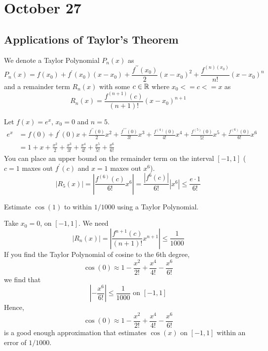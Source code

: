 \section{October 27}

\subsection{Applications of Taylor's Theorem}
\begin{definition}
    We denote a Taylor Polynomial $P_n(x)$ as
    $$P_n(x)=f\left(x_0\right)+f^{\prime}\left(x_0\right)\left(x-x_0\right)+\frac{f^{\prime \prime}\left(x_0\right)}{2}\left(x-x_0\right)^2+\frac{f^{(n)\left(x_0\right)}}{n !}\left(x-x_0\right)^n$$ 
    and a remainder term $R_n(x)$ with some $c \in \mathbb{R}$ where $x_0 <= c <= x$ as 
    $$R_n(x)=\frac{f^{(n+1)}(c)}{(n+1) !}\left(x-x_0\right)^{n+1}$$
\end{definition}

\noindent Let $f(x)=e^x$, $x_0=0$ and $n=5$.
\begin{align*}
    e^x &=f(0)+f^{\prime}(0) x+\frac{f^{\prime \prime}(0)}{2} x^2+\frac{f^{\prime \prime \prime}(0)}{3 !} x^3+\frac{f^{(4)}(0)}{4 !} x^4+\frac{f^{(5)}(0)}{5 !} x^5+\frac{f^{(6)}(0)}{6 !} x^6 \\
    &=1+x+\frac{x^2}{2}+\frac{x^3}{3 !}+\frac{x^4}{4 !}+\frac{x^5}{5 !}+\frac{x^6}{6 !}
\end{align*}
You can place an upper bound on the remainder term on the interval $[-1,1]$ ($c=1$ maxes out $f^{\prime}(c)$ and $x=1$ maxes out $x^6$).
$$\left|R_5(x)\right|=\left|\frac{f^{(6)}(c)}{6 !} x^6\right|=\frac{\left|f^6(c)\right|}{6 !}\left|x^6\right| \leq \frac{e \cdot 1}{6 !}$$

\begin{example}
    Estimate $\cos (1)$ to within $1 / 1000$ using a Taylor Polynomial.

    \noindent Take $x_0=0$, on $[-1,1]$. We need $$\left|R_n(x)\right|=\left|\frac{f^{n+1}(c)}{(n+1) !} x^{n+1}\right| \leq \frac{1}{1000}$$
    If you find the Taylor Polynomial of cosine to the 6th degree,
    $$\cos (0) \approx 1-\frac{x^2}{2 !}+\frac{x^4}{4 !}-\frac{x^6}{6 !}$$
    we find that
    $$\left|-\frac{x^6}{6 !}\right| \leq \frac{1}{1000} \text { on }[-1,1]$$
    Hence,
    $$\cos (0) \approx 1-\frac{x^2}{2 !}+\frac{x^4}{4 !}-\frac{x^6}{6 !}$$
    is a good enough approximation that estimates $\cos (x)$ on $[-1,1]$ within an error of $1 / 1000$.
\end{example}

